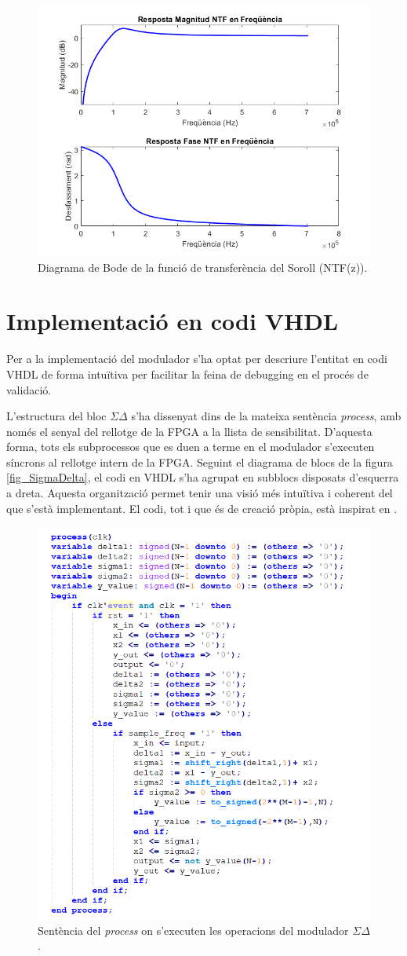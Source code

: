 \begin{figure}[H]
    \centering
    \includegraphics[width=0.5\linewidth]{Images/bodeNTFMOD2.png}
    \caption{Diagrama de Bode de la funció de transferència del Soroll (NTF(z)).}
    \label{figbodeNTF}
\end{figure}

\section{Implementació en codi VHDL}
\par Per a la implementació del modulador s'ha optat per descriure l'entitat en codi VHDL de forma intuïtiva per facilitar la feina de debugging en el procés de validació. 
\par L'estructura del bloc $\Sigma \Delta$ s'ha dissenyat dins de la mateixa sentència \textit{process}, amb només el senyal del rellotge de la FPGA a la llista de sensibilitat. D'aquesta forma, tots els subprocessos que es duen a terme en el modulador s'executen síncrons al rellotge intern de la FPGA. Seguint el diagrama de blocs de la figura \ref{fig_SigmaDelta}, el codi en VHDL s'ha agrupat en subblocs disposats d'esquerra a dreta. Aquesta organització permet tenir una visió més intuïtiva i coherent del que s'està implementant. El codi, tot i que és de creació pròpia, està inspirat en \cite{codiGit}.
\begin{figure}[H]
    \centering
    \includegraphics[width=0.5\linewidth]{Images/process_SDM.png}
    \caption{Sentència del \textit{process} on s'executen les operacions del modulador $\Sigma \Delta$.}
    \label{fig_processSDM}
\end{figure}
